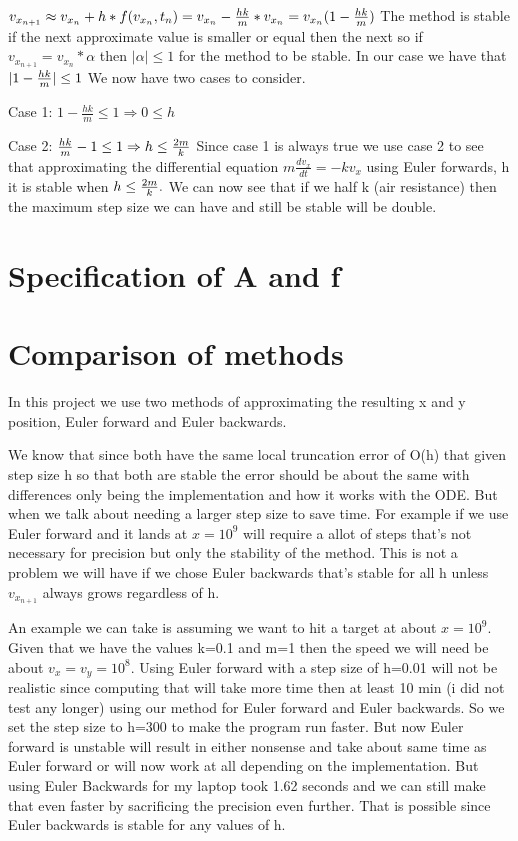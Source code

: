 \documentclass{article}
\begin{document}
$v_{x_{n+1}}\approx v_{x_{n}}+h*f(v_{x_{n}},t_n)=v_{x_{n}}-\frac{hk}{m}*v_{x_{n}}=v_{x_{n}}(1-\frac{hk}{m})\newline\newline$
The method is stable if the next approximate value is smaller or equal then the next so if $v_{x_{n+1}}=v_{x_{n}}*\alpha$ then $|\alpha|\le 1$ for the method to be stable. In our case we have that $|1-\frac{hk}{m}|\le 1\newline\newline$
We now have two cases to consider.

Case 1: $1-\frac{hk}{m}\le 1\Rightarrow 0\le h$

Case 2: $\frac{hk}{m}-1\le 1\Rightarrow h\le \frac{2m}{k}\newline\newline$
Since case 1 is always true we use case 2 to see that approximating the differential equation $m\frac{dv_x}{dt}=-kv_x$ using Euler forwards, h it is stable when $h\le \frac{2m}{k}.\newline\newline$
We can now see that if we half k (air resistance) then the maximum step size we can have and still be stable will be double.

\section{Specification of A and f}

\section{Comparison of methods}
In this project we use two methods of approximating the resulting x and y position, Euler forward and Euler backwards.

We know that since both have the same local truncation error of O(h) that given step size h so that both are stable the error should be about the same with differences only being the implementation and how it works with the ODE. But when we talk about needing a larger step size to save time. For example if we use Euler forward and it lands at $x=10^9$ will require a allot of steps that's not necessary for precision but only the stability of the method. This is not a problem we will have if we chose Euler backwards that's stable for all h unless $v_{x_{n+1}}$ always grows regardless of h.

An example we can take is assuming we want to hit a target at about $x=10^9$. Given that we have the values k=0.1 and m=1 then the speed we will need be about $v_x=v_y=10^8$. Using Euler forward with a step size of h=0.01 will not be realistic since computing that will take more time then at least 10 min (i did not test any longer) using our method for Euler forward and Euler backwards. So we set the step size to h=300 to make the program run faster. But now Euler forward is unstable will result in either nonsense and take about same time as Euler forward or will now work at all depending on the implementation. But using Euler Backwards for my laptop took 1.62 seconds and we can still make that even faster by sacrificing the precision even further. That is possible since Euler backwards is stable for any values of h.
\end{document}
